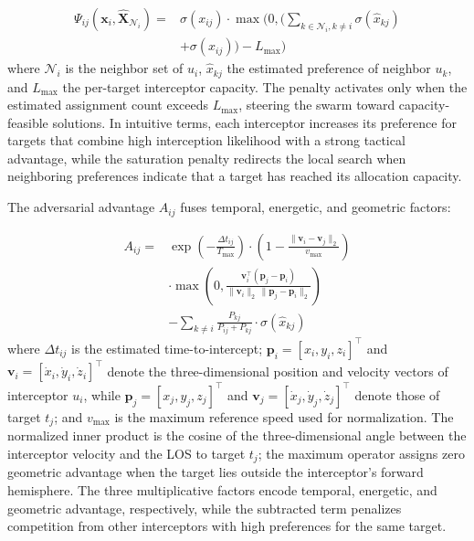 \documentclass[lettersize,journal]{IEEEtran}
\begin{document}
\begin{equation}
\label{eq:saturation_penalty}
\begin{split}
\Psi_{ij}(\mathbf{x}_i, \hat{\mathbf{X}}_{\mathcal{N}_i}) =& \sigma(x_{ij}) \cdot \max\Biggl(0, \Biggl(\sum_{k \in \mathcal{N}_i, k \neq i} \sigma(\hat{x}_{kj}) \\
&+ \sigma(x_{ij})\Biggr) - L_{\max}\Biggr)
\end{split}
\end{equation}
where $\mathcal{N}_i$ is the neighbor set of $u_i$, $\hat{x}_{kj}$ the estimated preference of neighbor $u_k$, and $L_{\max}$ the per-target interceptor capacity. 
The penalty activates only when the estimated assignment count exceeds $L_{\max}$, steering the swarm toward capacity-feasible solutions.
In intuitive terms, each interceptor increases its preference
for targets that combine high interception likelihood with a strong
tactical advantage, while the saturation penalty redirects the local search
when neighboring preferences indicate that a target has reached its
allocation capacity.


The adversarial advantage $A_{ij}$ fuses temporal, energetic, and geometric factors:

\begin{equation}
\label{eq:adversarial_advantage}
\begin{split}
A_{ij} =& \exp\left(-\frac{\Delta t_{ij}}{T_{\max}}\right) \cdot \left(1 - \frac{\|\mathbf{v}_i - \mathbf{v}_j\|_2}{v_{\max}}\right) \\
&\cdot \max\left(0,
\frac{\mathbf{v}_i^{\top}(\mathbf{p}_j-\mathbf{p}_i)}
{\|\mathbf{v}_i\|_2\,\|\mathbf{p}_j-\mathbf{p}_i\|_2}\right) \\
&- \sum_{k\neq i} \frac{P_{kj}}{P_{ij} + P_{kj}} \cdot \sigma(\hat{x}_{kj})
\end{split}
\end{equation}
where $\Delta t_{ij}$ is the estimated time-to-intercept; $\mathbf{p}_i=[x_i,y_i,z_i]^\top$ and $\mathbf{v}_i=[\dot{x}_i,\dot{y}_i,\dot{z}_i]^\top$ denote the three-dimensional position and velocity vectors of interceptor $u_i$, while $\mathbf{p}_j=[x_j,y_j,z_j]^\top$ and $\mathbf{v}_j=[\dot{x}_j,\dot{y}_j,\dot{z}_j]^\top$ denote those of target $t_j$; and $v_{\max}$ is the maximum reference speed used for normalization. 
The normalized inner product is the cosine of the three-dimensional angle between the interceptor velocity and the LOS to target $t_j$; the maximum operator assigns zero geometric advantage when the target lies outside the interceptor's forward hemisphere. The three multiplicative factors encode temporal, energetic, and geometric advantage, respectively, while the subtracted term penalizes competition from other interceptors with high preferences for the same target.
\end{document}

